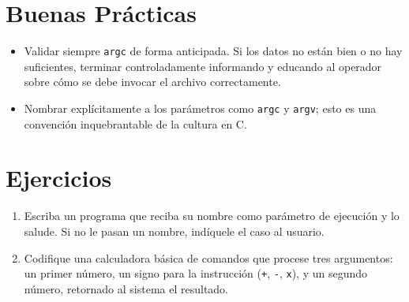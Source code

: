 \documentclass[12pt,a4paper]{article}
\begin{document}
\section{Buenas Prácticas}
\begin{itemize}
    \item Validar siempre \texttt{argc} de forma anticipada. Si los datos no están bien o no hay suficientes, terminar controladamente informando y educando al operador sobre cómo se debe invocar el archivo correctamente.
    \item Nombrar explícitamente a los parámetros como \texttt{argc} y \texttt{argv}; esto es una convención inquebrantable de la cultura en C.
\end{itemize}

\section{Ejercicios}
\begin{enumerate}
    \item Escriba un programa que reciba su nombre como parámetro de ejecución y lo salude. Si no le pasan un nombre, indíquele el caso al usuario.
    \item Codifique una calculadora básica de comandos que procese tres argumentos: un primer número, un signo para la instrucción (\texttt{+}, \texttt{-}, \texttt{x}), y un segundo número, retornado al sistema el resultado.
\end{enumerate}
\end{document}
